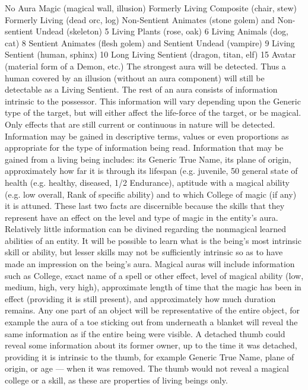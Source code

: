 \documentclass[a4paper]{article}
\begin{document}
\begin{multicols}{3}
No Aura
Magic (magical wall, illusion)
Formerly Living Composite (chair, stew)
Formerly Living (dead orc, log)
Non-Sentient Animates (stone golem) and
Non-sentient Undead (skeleton)
5
Living Plants (rose, oak)
6
Living Animals (dog, cat)
8
Sentient Animates (flesh golem) and
Sentient Undead (vampire)
9
Living Sentient (human, sphinx)
10
Long Living Sentient (dragon, titan, elf)
15
Avatar (material form of a Demon, etc.)
The strongest aura will be detected. Thus a human
covered by an illusion (without an aura component) will still be detectable as a Living Sentient.
The rest of an aura consists of information intrinsic
to the possessor. This information will vary depending upon the Generic type of the target, but
will either affect the life-force of the target, or be
magical. Only effects that are still current or continuous in nature will be detected. Information may
be gained in descriptive terms, values or even
proportions as appropriate for the type of information being read.
Information that may be gained from a living being
includes: its Generic True Name, its plane of origin, approximately how far it is through its lifespan (e.g. juvenile, 50%
general state of health (e.g. healthy, diseased, 1/2
Endurance), aptitude with a magical ability (e.g.
low overall, Rank of specific ability) and to which
College of magic (if any) it is attuned. These last
two facts are discernible because the skills that
they represent have an effect on the level and type
of magic in the entity’s aura. Relatively little information can be divined regarding the nonmagical learned abilities of an entity. It will be
possible to learn what is the being’s most intrinsic
skill or ability, but lesser skills may not be sufficiently intrinsic so as to have made an impression
on the being’s aura.
Magical auras will include information such as
College, exact name of a spell or other effect, level
of magical ability (low, medium, high, very high),
approximate length of time that the magic has been
in effect (providing it is still present), and approximately how much duration remains.
Any one part of an object will be representative of
the entire object, for example the aura of a toe
sticking out from underneath a blanket will reveal
the same information as if the entire being were
visible. A detached thumb could reveal some information about its former owner, up to the time it
was detached, providing it is intrinsic to the thumb,
for example Generic True Name, plane of origin,
or age — when it was removed. The thumb would
not reveal a magical college or a skill, as these are
properties of living beings only.


\end{multicols}
\end{document}
